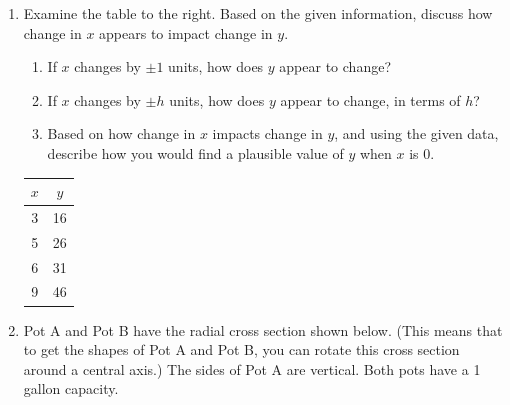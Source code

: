 \documentclass[11pt]{article}
\theoremstyle{definition}
\begin{document}
\begin{enumerate}[resume]
\begin{enumerate}[resume]
	{\it Note:} The definition of graph of an inequality in $x$ and $y$ is similar to that of graph of an equation: It is the set of points $(a, b)$ that if you evaluate the inequality at $x=a$ and $y=b$, you get a true statement. The property being tested here is of a half-plane, and whether the points in that half-plane satisfy a given inequality.
	
	\item Direct comparison test (for convergence of a series).
	\item Ratio test (for convergence of a series).
	\end{enumerate}

\item \label{h: covariation intro morgan}
Examine the table to the right. Based on the given information, discuss how change in $x$ appears to impact change in $y$. 

\begin{minipage}{5in}\raggedright
	\begin{enumerate}
	\item If $x$ changes by $\pm 1$ units, how does $y$ appear to change?
	\item If $x$ changes by $\pm h$ units, how does $y$ appear to change, in terms of $h$?
	\item Based on how change in $x$ impacts change in $y$, and using the given data, describe how you would find a plausible value of $y$ when $x$ is $0$. 
	\end{enumerate}
\end{minipage}
\begin{minipage}{1in}
\vspace*{-12pt}
\begin{center}
\begin{tabular}{c|c}
$x$ & $y$ \\ \hline
3 & 16 \\
5 & 26 \\
6 & 31 \\
9 & 46 \\
\end{tabular}
\end{center}
\end{minipage}

\item \label{h: covariation linear relationship nonlinear variables}
Pot A and Pot B have the radial cross section shown below. (This means that to get the shapes of Pot A and Pot B, you can rotate this cross section around a central axis.) The sides of Pot A are vertical. Both pots have a 1 gallon capacity.


\end{enumerate}
\end{document}
